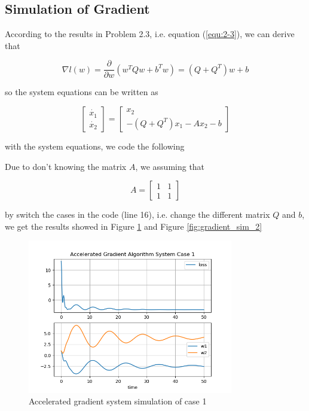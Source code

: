\documentclass{article}
\begin{document}
\subsection{Simulation of Gradient}

According to the results in Problem 2.3, i.e. equation (\ref{equ:2-3}), we can derive that

\begin{equation}
    \nabla l(w)=\frac{\partial}{\partial w}(w^TQw+b^Tw)=(Q+Q^T)w+b
\end{equation}

so the system equations can be written as

\begin{equation}
    \begin{bmatrix}
        \dot{x_1}\\\dot{x_2}
    \end{bmatrix}
    =\begin{bmatrix}
        x_2\\-(Q+Q^T)x_1-Ax_2-b
    \end{bmatrix}
\end{equation}

with the system equations, we code the following



Due to don't knowing the matrix $A$, we assuming that

\begin{equation}
    A=\begin{bmatrix}
        1 & 1 \\ 1 & 1
    \end{bmatrix}
\end{equation}

by switch the cases in the code (line 16),
i.e. change the different matrix $Q$ and $b$,
we get the results showed in Figure \ref{fig:gradient_sim_1} and Figure \ref{fig:gradient_sim_2}

\begin{figure}[htbp]
    \centering
    \includegraphics[width=0.8\textwidth]{img/accelerated_gradient_simulation_case_1.png}
    \caption{Accelerated gradient system simulation of case 1}
    \label{fig:gradient_sim_1}
\end{figure}
\end{document}
